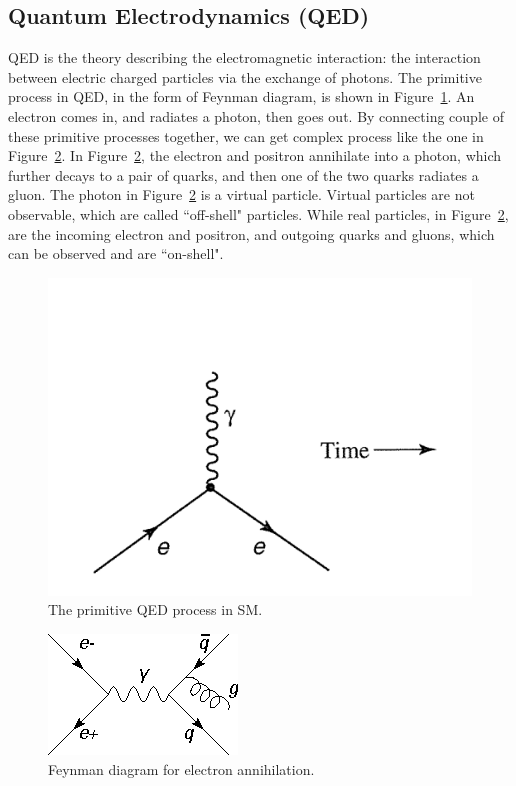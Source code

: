 
\subsection{Quantum Electrodynamics (QED)}

QED is the theory describing the electromagnetic interaction: the 
interaction between electric charged particles via the exchange of photons. 
The primitive process in QED, in the form of Feynman diagram, is shown in 
Figure~\ref{fig:primitiveQED}. An electron comes in, and radiates a photon, then goes out. 
By connecting couple of these primitive processes together, we can get complex process like the one in
Figure~\ref{fig:gluonradiation}. In Figure~\ref{fig:gluonradiation}, the electron and positron annihilate into a
photon, which further decays to a pair of quarks, and then one of the two quarks radiates a gluon. 
The photon in Figure~\ref{fig:gluonradiation} is a virtual particle. Virtual particles are not
observable, which are called ``off-shell" particles. While real particles, in Figure~\ref{fig:gluonradiation}, 
are the incoming electron and positron, and outgoing quarks and gluons, which can be observed and
are ``on-shell". 
 
\begin{figure}[!htbp]
\centering
\includegraphics[width=.7\textwidth]{figures/primitiveQED.png}
\caption{The primitive QED process in SM. }
\label{fig:primitiveQED}
\end{figure} 

 
\begin{figure}[!htbp]
\centering
\includegraphics[width=.7\textwidth]{figures/Radiate_gluon.png}
\caption{Feynman diagram for electron annihilation.}
\label{fig:gluonradiation}
\end{figure} 



